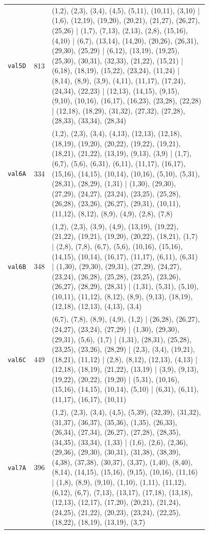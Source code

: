 \begin{landscape}
\begin{longtable}{lr>{\tiny\raggedright\arraybackslash}p{0.78\linewidth}}
\texttt{val5D} & 813 & (1,2), (2,3), (3,4), (4,5), (5,11), (10,11), (3,10) | (1,6), (12,19), (19,20), (20,21), (21,27), (26,27), (25,26) | (1,7), (7,13), (2,13), (2,8), (15,16), (4,10) | (6,7), (13,14), (14,20), (20,26), (26,31), (29,30), (25,29) | (6,12), (13,19), (19,25), (25,30), (30,31), (32,33), (21,22), (15,21) | (6,18), (18,19), (15,22), (23,24), (11,24) | (8,14), (8,9), (3,9), (4,11), (11,17), (17,24), (24,34), (22,23) | (12,13), (14,15), (9,15), (9,10), (10,16), (16,17), (16,23), (23,28), (22,28) | (12,18), (18,29), (31,32), (27,32), (27,28), (28,33), (33,34), (28,34) \\[2pt]
\texttt{val6A} & 334 & (1,2), (2,3), (3,4), (4,13), (12,13), (12,18), (18,19), (19,20), (20,22), (19,22), (19,21), (18,21), (21,22), (13,19), (9,13), (3,9) | (1,7), (6,7), (5,6), (6,31), (6,11), (11,17), (16,17), (15,16), (14,15), (10,14), (10,16), (5,10), (5,31), (28,31), (28,29), (1,31) | (1,30), (29,30), (27,29), (24,27), (23,24), (23,25), (25,28), (26,28), (23,26), (26,27), (29,31), (10,11), (11,12), (8,12), (8,9), (4,9), (2,8), (7,8) \\[2pt]
\texttt{val6B} & 348 & (1,2), (2,3), (3,9), (4,9), (13,19), (19,22), (21,22), (19,21), (19,20), (20,22), (18,21), (1,7) | (2,8), (7,8), (6,7), (5,6), (10,16), (15,16), (14,15), (10,14), (16,17), (11,17), (6,11), (6,31) | (1,30), (29,30), (29,31), (27,29), (24,27), (23,24), (26,28), (25,28), (23,25), (23,26), (26,27), (28,29), (28,31) | (1,31), (5,31), (5,10), (10,11), (11,12), (8,12), (8,9), (9,13), (18,19), (12,18), (12,13), (4,13), (3,4) \\[2pt]
\texttt{val6C} & 449 & (6,7), (7,8), (8,9), (4,9), (1,2) | (26,28), (26,27), (24,27), (23,24), (27,29) | (1,30), (29,30), (29,31), (5,6), (1,7) | (1,31), (28,31), (25,28), (23,25), (23,26), (28,29) | (2,3), (3,4), (19,21), (18,21), (11,12) | (2,8), (8,12), (12,13), (4,13) | (12,18), (18,19), (21,22), (13,19) | (3,9), (9,13), (19,22), (20,22), (19,20) | (5,31), (10,16), (15,16), (14,15), (10,14), (5,10) | (6,31), (6,11), (11,17), (16,17), (10,11) \\[2pt]
\texttt{val7A} & 396 & (1,2), (2,3), (3,4), (4,5), (5,39), (32,39), (31,32), (31,37), (36,37), (35,36), (1,35), (26,33), (26,34), (27,34), (26,27), (27,28), (28,35), (34,35), (33,34), (1,33) | (1,6), (2,6), (2,36), (29,36), (29,30), (30,31), (31,38), (38,39), (4,38), (37,38), (30,37), (3,37), (1,40), (8,40), (8,14), (14,15), (15,16), (9,15), (10,16), (11,16) | (1,8), (8,9), (9,10), (1,10), (1,11), (11,12), (6,12), (6,7), (7,13), (13,17), (17,18), (13,18), (12,13), (12,17), (17,20), (20,21), (21,24), (24,25), (21,22), (20,23), (23,24), (22,25), (18,22), (18,19), (13,19), (3,7) \\[2pt]

\end{longtable}
\end{landscape}
